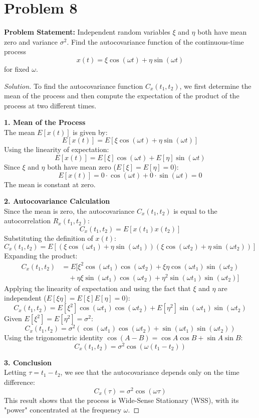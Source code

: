 \documentclass{article}
\begin{document}
\section*{Problem 8}
\textbf{Problem Statement:}
Independent random variables $\xi$ and $\eta$ both have mean zero and variance $\sigma^2$. Find the autocovariance function of the continuous-time process
\[ x(t) = \xi \cos(\omega t) + \eta \sin(\omega t) \]
for fixed $\omega$.

\begin{proof}[Solution]
	To find the autocovariance function $C_x(t_1, t_2)$, we first determine the mean of the process and then compute the expectation of the product of the process at two different times.
	
	\textbf{1. Mean of the Process}\\
	The mean $E[x(t)]$ is given by:
	\[ E[x(t)] = E[\xi \cos(\omega t) + \eta \sin(\omega t)] \]
	Using the linearity of expectation:
	\[ E[x(t)] = E[\xi] \cos(\omega t) + E[\eta] \sin(\omega t) \]
	Since $\xi$ and $\eta$ both have mean zero ($E[\xi] = E[\eta] = 0$):
	\[ E[x(t)] = 0 \cdot \cos(\omega t) + 0 \cdot \sin(\omega t) = 0 \]
	The mean is constant at zero.
	
	\textbf{2. Autocovariance Calculation}\\
	Since the mean is zero, the autocovariance $C_x(t_1, t_2)$ is equal to the autocorrelation $R_x(t_1, t_2)$:
	\[ C_x(t_1, t_2) = E[x(t_1)x(t_2)] \]
	Substituting the definition of $x(t)$:
	\[ C_x(t_1, t_2) = E[(\xi \cos(\omega t_1) + \eta \sin(\omega t_1))(\xi \cos(\omega t_2) + \eta \sin(\omega t_2))] \]
	Expanding the product:
	\begin{align*}
		C_x(t_1, t_2) &= E[\xi^2 \cos(\omega t_1)\cos(\omega t_2) + \xi\eta \cos(\omega t_1)\sin(\omega t_2) \\
		&\quad + \eta\xi \sin(\omega t_1)\cos(\omega t_2) + \eta^2 \sin(\omega t_1)\sin(\omega t_2)]
	\end{align*}
	Applying the linearity of expectation and using the fact that $\xi$ and $\eta$ are independent ($E[\xi\eta] = E[\xi]E[\eta] = 0$):
	\[ C_x(t_1, t_2) = E[\xi^2] \cos(\omega t_1)\cos(\omega t_2) + E[\eta^2] \sin(\omega t_1)\sin(\omega t_2) \]
	Given $E[\xi^2] = E[\eta^2] = \sigma^2$:
	\[ C_x(t_1, t_2) = \sigma^2 (\cos(\omega t_1)\cos(\omega t_2) + \sin(\omega t_1)\sin(\omega t_2)) \]
	Using the trigonometric identity $\cos(A-B) = \cos A \cos B + \sin A \sin B$:
	\[ C_x(t_1, t_2) = \sigma^2 \cos(\omega(t_1 - t_2)) \]
	
	\textbf{3. Conclusion}\\
	Letting $\tau = t_1 - t_2$, we see that the autocovariance depends only on the time difference:
	\[ C_x(\tau) = \sigma^2 \cos(\omega \tau) \]
	This result shows that the process is Wide-Sense Stationary (WSS), with its "power" concentrated at the frequency $\omega$.
\end{proof}
\end{document}
